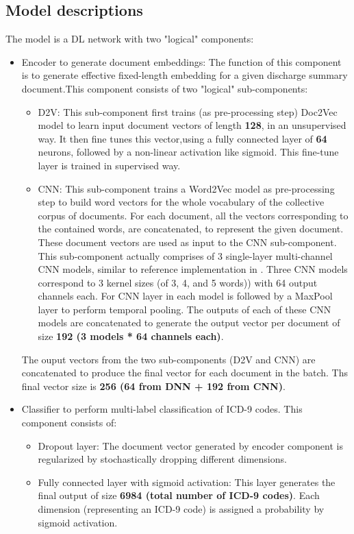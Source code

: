 \documentclass[11pt,a4paper]{article}
\begin{document}
\subsection{Model descriptions}
The model is a DL network with two "logical" components:
\begin{itemize}
    \item Encoder to generate document embeddings: The function of this component is to generate effective fixed-length embedding for a given discharge summary document.This component consists of two "logical" sub-components:
    \begin{itemize}
    		\item D2V: This sub-component first trains (as pre-processing step) Doc2Vec model to learn input document vectors of length \textbf{128}, in an unsupervised way. It then fine tunes this vector,using a fully connected layer of \textbf{64} neurons, followed by a non-linear activation like sigmoid. This fine-tune layer is trained in supervised way.
    		\item CNN: This sub-component trains a Word2Vec model as pre-processing step to build word vectors for the whole vocabulary of the collective corpus of documents. For each document, all the vectors corresponding to the contained words, are concatenated, to represent the given document. These document vectors are used as input to the CNN sub-component. This sub-component actually comprises of 3 single-layer multi-channel CNN models, similar to reference implementation in \cite{kim2014convolutional}. Three CNN models correspond to 3 kernel sizes (of 3, 4, and 5 words)) with 64 output channels each. For CNN layer in each model is followed by a MaxPool layer to perform temporal pooling. The outputs of each of these CNN models are concatenated to generate the output vector per document of size \textbf{192 (3 models * 64 channels each)}.
    \end{itemize}
The ouput vectors from the two sub-components (D2V and CNN) are concatenated to produce the final vector for each document in the batch. Ths final vector size is \textbf{256 (64 from DNN + 192 from CNN)}.

	\item Classifier to perform multi-label classification of ICD-9 codes. This component consists of:
	 \begin{itemize}
	 	\item Dropout layer: The document vector generated by encoder component is regularized by stochastically dropping different dimensions.
	 	\item Fully connected layer with sigmoid activation: This layer generates the final output of size \textbf{6984 (total number of ICD-9 codes)}. Each dimension (representing an ICD-9 code) is assigned a probability by sigmoid activation.
	 \end{itemize}
\end{itemize}
\end{document}
